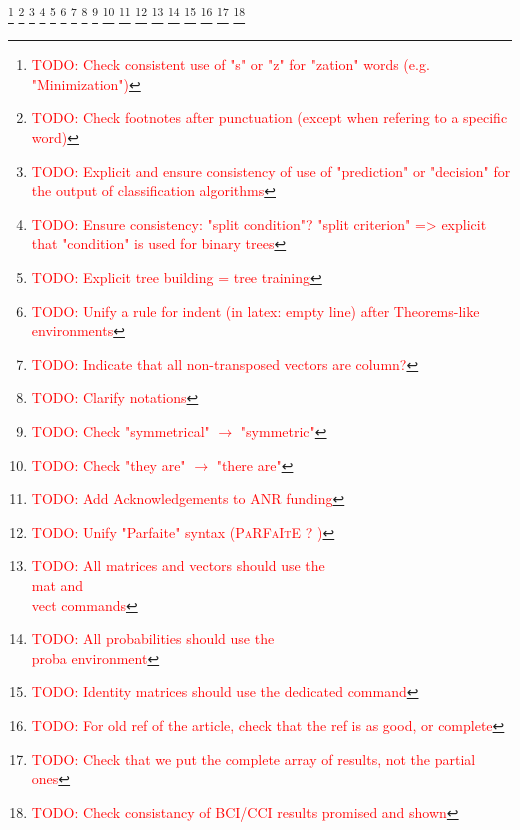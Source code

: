 \documentclass[a4paper, 12pt]{book}
\newcommand{\todo}[1]{%
\textcolor{red}{\footnote{\textcolor{red}{TODO: #1}}}}
\newcommand{\vect}[1]{\boldsymbol{#1}}
\newcommand{\mat}[1]{\boldsymbol{#1}}
\newcommand{\proba}[1]{\mathbb{P}\left(#1\right)}
\begin{document}
\diplayFirstPage




\printbibliography

\todo{Check consistent use of "s" or "z" for "zation" words (e.g. "Minimization")}
\todo{Check footnotes after punctuation (except when refering to a specific word)}
\todo{Explicit and ensure consistency of use of "prediction" or "decision" for the output of classification algorithms}
\todo{Ensure consistency: "split condition"? "split criterion" => explicit that "condition" is used for binary trees}
\todo{Explicit tree building = tree training}
\todo{Unify a rule for indent (in latex: empty line) after Theorems-like environments}
\todo{Indicate that all non-transposed vectors are column?}
\todo{Clarify notations}
\todo{Check "symmetrical" $\rightarrow$ "symmetric"}
\todo{Check "they are" $\rightarrow$ "there are"}
\todo{Add Acknowledgements to ANR funding}
\todo{Unify "Parfaite" syntax (\textsc{PaRFaItE} ? )}
\todo{All matrices and vectors should use the \\mat and \\vect commands}
\todo{All probabilities should use the \\proba environment}
\todo{Identity matrices should use the dedicated command}
\todo{For old ref of the article, check that the ref is as good, or complete}
\todo{Check that we put the complete array of results, not the partial ones}
\todo{Check consistancy of BCI/CCI results promised and shown}
\diplayLastPage
\end{document}
